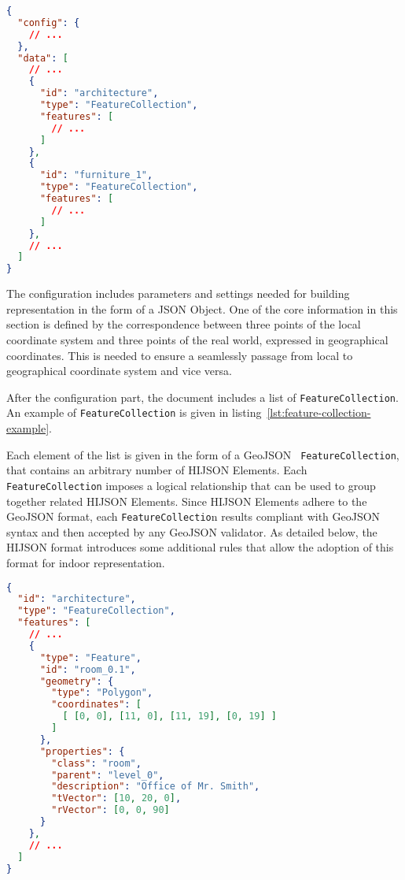 
\begin{lstlisting}[language=json, label={lst:hijson-example}, captionpos=b, caption=Example of HIJSON document.]
{
  "config": {
    // ...
  },
  "data": [
    // ...
    {
      "id": "architecture",
      "type": "FeatureCollection",
      "features": [
        // ...
      ] 
    },
    {
      "id": "furniture_1",
      "type": "FeatureCollection",
      "features": [
        // ...
      ] 
    },
    // ...
  ]
}
\end{lstlisting}


The configuration includes parameters and settings needed for building representation in the form of a JSON Object. One of the core information in this section is defined by the correspondence between three points of the local coordinate system and three points of the real world, expressed in geographical coordinates. This is needed to ensure a seamlessly passage from local to geographical coordinate system and vice versa.

After the configuration part, the document includes a list of \texttt{FeatureCollection}. An example
of \texttt{FeatureCollection} is given in listing~\ref{lst:feature-collection-example}.

Each element of the list is given in the form of a GeoJSON {\tt
FeatureCollection}, that contains an arbitrary  number of HIJSON Elements.
Each \texttt{FeatureCollection} imposes a logical relationship that can be used
to group together related HIJSON Elements. Since  HIJSON Elements adhere to
the GeoJSON format, each \texttt{FeatureCollectio}n results compliant with GeoJSON
syntax and then accepted by any GeoJSON validator. As detailed below, the
HIJSON format  introduces some additional rules that allow the adoption of
this format for indoor representation.

\begin{lstlisting}[language=json, label={lst:feature-collection-example}, captionpos=b,  caption=Example of \texttt{FeatureCollection}.]
{
  "id": "architecture",
  "type": "FeatureCollection",
  "features": [
    // ...
    {
      "type": "Feature",
      "id": "room_0.1",
      "geometry": {
        "type": "Polygon",
        "coordinates": [
          [ [0, 0], [11, 0], [11, 19], [0, 19] ]
        ]
      },
      "properties": {
        "class": "room",
        "parent": "level_0",
        "description": "Office of Mr. Smith",
        "tVector": [10, 20, 0],
        "rVector": [0, 0, 90]
      }
    },
    // ...
  ]
}
\end{lstlisting}


